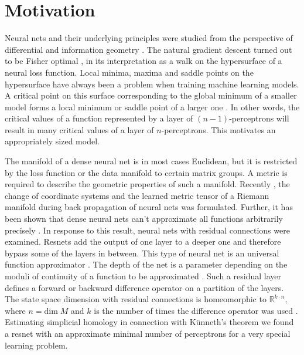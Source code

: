 \documentclass[envcountsect,runningheads]{llncs}
\begin{document}
\section{Motivation}
Neural nets and their underlying principles were studied from the perspective of differential and information geometry . The natural gradient descent turned out to be Fisher optimal , in its interpretation as a walk on the hypersurface of a neural loss function. Local minima, maxima and saddle points on the hypersurface have always been a problem when training machine learning models. A critical point on this surface corresponding to the global minimum of a smaller model forms a local minimum or saddle point of a larger one . In other words, the critical values of a function represented by a layer of $(n-1)$-perceptrons will result in many critical values of a layer of $n$-perceptrons. This motivates an appropriately sized model.

The manifold of a dense neural net is in most cases Euclidean, but it is restricted by the loss function or the data manifold to certain matrix groups. A metric is required to describe the geometric properties of such a manifold. Recently , the change of coordinate systems and the learned metric tensor of a Riemann manifold during back propagation of neural nets was formulated. Further, it has been shown that dense neural nets can't approximate all functions arbitrarily precisely . In response to this result, neural nets with residual connections were examined. Resnets add the output of one layer to a deeper one and therefore bypass some of the layers in between. This type of neural net is an universal function approximator . The depth of the net is a parameter depending on the moduli of continuity of a function to be approximated . Such a residual layer defines a forward or backward difference operator on a partition of the layers. The state space dimension with residual connections is homeomorphic to $\mathbb{R}^{k \cdot n}$, where $n = \text{dim} \; M$ and $k$ is the number of times the difference operator was used . Estimating simplicial homology in connection with Künneth's theorem we found a resnet with an approximate minimal number of perceptrons for a very special learning problem.
\end{document}
